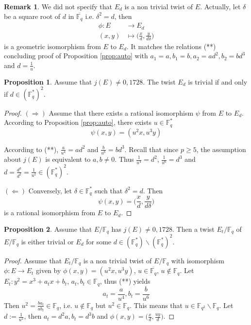 \documentclass[10pt]{article}
\theoremstyle{definition}
\newtheorem{proposition}{Proposition}
\newtheorem{remark}{Remark}
\newcommand{\F}{\mathbb{F}}
\begin{document}
\begin{remark}
We did not specify that $E_d$ is a non trivial twist of $E$.
Actually, let $\delta$ be a square root of $d$ in $\overline{\F_q}$ i.e. $\delta^2 = d$, then
\begin{align*}
\phi : E & \to E_d\\
      (x,y)& \mapsto \big(\frac{x}{d},\frac{y}{d\delta}\big)
\end{align*}
is a geometric isomorphism from $E$ to $E_d$.
It matches the relations (**) concluding proof of Proposition \ref{prop:auto} with $a_1=a, b_1=b, a_2 = ad^2, b_2=bd^3$ and $d = \frac1u$.
\end{remark}

\begin{proposition}\label{prop:trivialtwist}
Assume that $j(E) \neq 0,1728$.
The twist $E_d$ is trivial if and only if $d \in (\F_q^*)^2$.
\end{proposition}

\begin{proof}
$(\Rightarrow)$ Assume that there exists a rational isomorphism $\psi$ from $E$ to $E_d$.
According to Proposition \ref{prop:auto}, there exists $u \in \F_q^*$
\[ \psi(x,y) = (u^2x,u^3y) \]

According to (**), $\frac{a}{u^4} = ad^2$ and $\frac{b}{u^6} = bd^3$.
Recall that since $ p \geq 5$, the assumption about $j(E)$ is equivalent to $a,b \neq 0$.
Thus $\frac{1}{u^4} = d^2$, $\frac{1}{u^6} = d^3$ and $d = \frac{d^3}{d^2} = \frac{1}{u^2} \in (\F_q^*)^2$.

$(\Leftarrow)$ Conversely, let $\delta \in \F_q^*$ such that $\delta^2 = d$.
Then 
\[ \psi(x,y) = \big(\frac{x}{d},\frac{y}{d\delta}\big) \]
is a rational isomorphism from $E$ to $E_d$.
\end{proof}


\begin{proposition}
Assume that $E/\F_q$ has $j(E) \neq 0, 1728$. 
Then a twist $E_t/\F_q$ of $E/\F_q$ is either trivial or $E_d$ for some $d \in (\F_q^*) \backslash (\F_q^*)^2$.
\end{proposition}
\begin{proof}
Assume that $E_t/\F_q$ is a non trivial twist of $E/\F_q$ with isomorphism $\phi : E \to E_t$ given by $\phi(x,y) = (u^2x,u^3y)$, $u \in \overline{\F_q}$, $u \notin \F_q$.
Let $E_t : y^2 = x^3 +a_tx+b_t$, $a_t,b_t \in \F_q$, thus (**) yields
\[ a_t = \frac{a}{u^4}, b_t = \frac{b}{u^6} \]
Then $u^2 = \frac{ba_t}{ab_t} \in \F_q$, i.e. $u \notin \F_q$ but $u^2 \in \F_q$.
This means that $u \in \F_{q^2} \backslash \F_q$.
Let $d := \frac{1}{u^2}$, then $a_t = d^2a, b_t = d^3b$ and $\phi(x,y) = \big(\frac{x}{d},\frac{uy}{d} \big)$.
\end{proof}
\end{document}
